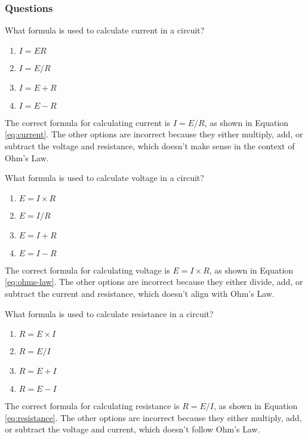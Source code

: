 \subsubsection*{Questions}

\begin{tcolorbox}[colback=gray!10!white,colframe=black!75!black,title={T5D01}]
    What formula is used to calculate current in a circuit?
    \begin{enumerate}[label=\Alph*),noitemsep]
        \item \(I = E R\)
        \item \textbf{\(I = E / R\)}
        \item \(I = E + R\)
        \item \(I = E - R\)
    \end{enumerate}
\end{tcolorbox}
The correct formula for calculating current is \(I = E / R\), as shown in Equation \ref{eq:current}. The other options are incorrect because they either multiply, add, or subtract the voltage and resistance, which doesn’t make sense in the context of Ohm’s Law.

\begin{tcolorbox}[colback=gray!10!white,colframe=black!75!black,title={T5D02}]
    What formula is used to calculate voltage in a circuit?
    \begin{enumerate}[label=\Alph*),noitemsep]
        \item \textbf{\(E = I \times R\)}
        \item \(E = I / R\)
        \item \(E = I + R\)
        \item \(E = I - R\)
    \end{enumerate}
\end{tcolorbox}
The correct formula for calculating voltage is \(E = I \times R\), as shown in Equation \ref{eq:ohms-law}. The other options are incorrect because they either divide, add, or subtract the current and resistance, which doesn’t align with Ohm’s Law.

\begin{tcolorbox}[colback=gray!10!white,colframe=black!75!black,title={T5D03}]
    What formula is used to calculate resistance in a circuit?
    \begin{enumerate}[label=\Alph*),noitemsep]
        \item \(R = E \times I\)
        \item \textbf{\(R = E / I\)}
        \item \(R = E + I\)
        \item \(R = E - I\)
    \end{enumerate}
\end{tcolorbox}
The correct formula for calculating resistance is \(R = E / I\), as shown in Equation \ref{eq:resistance}. The other options are incorrect because they either multiply, add, or subtract the voltage and current, which doesn’t follow Ohm’s Law.

